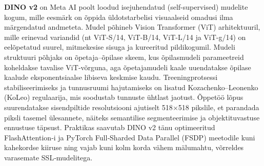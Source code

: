 \textbf{DINO v2} on Meta AI poolt loodud isejuhendatud (self-supervised) mudelite kogum,
mille eesmärk on õppida üldotstarbelisi visuaalseid omadusi ilma märgendatud
andmeteta. Mudel põhineb Vision Transformer (ViT) arhitektuuril, mille erinevad
variandid (nt ViT-S/14, ViT-B/14, ViT-L/14 ja ViT-g/14) on eelõpetatud suurel,
mitmekesise sisuga ja kureeritud pildikogumil. Mudeli struktuuri põhjaks on
õpetaja--õpilase skeem, kus õpilasmudeli parameetreid koheldakse tavalise ViT‑võrguna, aga õpetajamudeli
kaale uuendatakse õpilase kaalude eksponentsiaalse libiseva keskmise kaudu.
Treeningprotsessi stabiliseerimiseks ja tunnusruumi hajutamiseks on lisatud
Kozachenko--Leonenko (KoLeo) regulaarija, mis soodustab tunnuste ühtlast jaotust.
Õppetöö lõpus suurendatakse sisendpiltide resolutsiooni
ajutiselt 518\(\times \)518 pikslile, et parandada piksli tasemel
ülesannete, näiteks semantilise segmenteerimise ja objektituvastuse ennustuse
täpsust. Praktikas saavutab DINO v2 tänu optimeeritud
FlashAttention‑i ja PyTorch Full‑Sharded Data Parallel (FSDP) meetodile kuni
kahekordse kiiruse ning vajab kuni kolm korda vähem mälumahtu, võrreldes varasemate SSL‑mudelitega. \cite{oquabDINOv2LearningRobust2024}